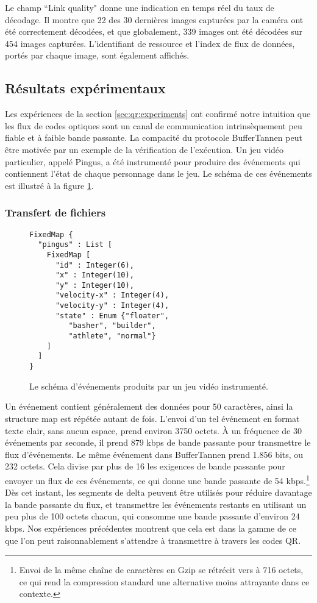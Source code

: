 Le champ ``Link quality" donne une indication en temps réel du taux de décodage. Il montre que 22 des 30 dernières images capturées par la caméra ont été correctement décodées, et que globalement, 339 images ont été décodées sur 454 images capturées. L'identifiant de ressource et l'index de flux de données, portés par chaque image, sont également affichés.

\subsection{Résultats expérimentaux}
\setcounter{paragraph}{0}

Les expériences de la section \ref{sec:qr:experiments} ont confirmé notre intuition que les flux de codes optiques sont un canal de communication intrinsèquement peu fiable et à faible bande passante. La compacité du protocole BufferTannen peut être motivée par un exemple de la vérification de l'exécution. Un jeu vidéo particulier, appelé Pingus, a été instrumenté pour produire des événements qui contiennent l'état de chaque personnage dans le jeu. Le schéma de ces événements est illustré à la figure \ref{fig:qr:pingus-schema}.

\subsubsection{Transfert de fichiers}

\begin{figure}
\centering
\begin{verbatim}
FixedMap {
  "pingus" : List [
    FixedMap [
      "id" : Integer(6),
      "x" : Integer(10),
      "y" : Integer(10),
      "velocity-x" : Integer(4),
      "velocity-y" : Integer(4),
      "state" : Enum {"floater",
         "basher", "builder",
         "athlete", "normal"}
    ]
  ]
}
\end{verbatim}
\caption{Le schéma d'événements produits par un jeu vidéo instrumenté.}
\label{fig:qr:pingus-schema}
\end{figure}

Un événement contient généralement des données pour 50 caractères, ainsi la structure map est répétée autant de fois. L'envoi d'un tel événement en format texte clair, sans aucun espace, prend environ 3750 octets. À un fréquence de 30 événements par seconde, il prend 879 kbps de bande passante pour transmettre le flux d'événements. Le même événement dans BufferTannen prend 1.856 bits, ou 232 octets. Cela divise par plus de 16 les exigences de bande passante pour envoyer un flux de ces événements, ce qui donne une bande passante de 54 kbps.\footnote{Envoi de la même chaîne de caractères en Gzip se rétrécit vers à 716 octets, ce qui rend la compression standard une alternative moins attrayante dans ce contexte.} Dès cet instant, les segments de delta peuvent être utilisés pour réduire davantage la bande passante du flux, et transmettre les événements restants en utilisant un peu plus de 100 octets chacun, qui consomme une bande passante d'environ 24 kbps. Nos expériences précédentes montrent que cela est dans la gamme de ce que l'on peut raisonnablement s'attendre à transmettre à travers les codes QR.

